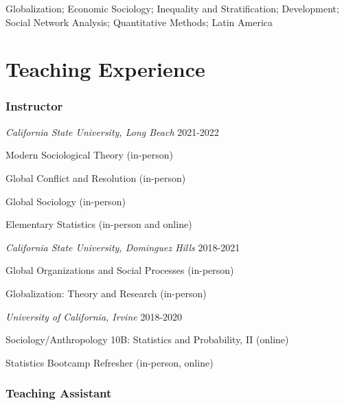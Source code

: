 \documentclass[10pt,]{article}
\providecommand{\tightlist}{%
  \setlength{\itemsep}{0pt}\setlength{\parskip}{0pt}}
\renewenvironment{itemize}{
  \begin{list}{}{
    \setlength{\leftmargin}{1.5em}
  }
}{
  \end{list}
}
\begin{document}
\begin{itemize}
\tightlist
\item
  Globalization; Economic Sociology; Inequality and Stratification;
  Development; Social Network Analysis; Quantitative Methods; Latin
  America
\end{itemize}

\hypertarget{teaching-experience}{%
\section{Teaching Experience}\label{teaching-experience}}

\hypertarget{instructor}{%
\subsubsection{Instructor}\label{instructor}}

\emph{California State University, Long Beach} \hfill 2021-2022

\begin{itemize}
\tightlist
\item
  Modern Sociological Theory (in-person)
\item
  Global Conflict and Resolution (in-person)
\item
  Global Sociology (in-person)
\item
  Elementary Statistics (in-person and online)
\end{itemize}

\emph{California State University, Dominguez Hills} \hfill 2018-2021

\begin{itemize}
\tightlist
\item
  Global Organizations and Social Processes (in-person)
\item
  Globalization: Theory and Research (in-person)
\end{itemize}

\emph{University of California, Irvine} \hfill 2018-2020

\begin{itemize}
\tightlist
\item
  Sociology/Anthropology 10B: Statistics and Probability, II (online)
\item
  Statistics Bootcamp Refresher (in-person, online)
\end{itemize}

\hypertarget{teaching-assistant}{%
\subsubsection{Teaching Assistant}\label{teaching-assistant}}
\end{document}
